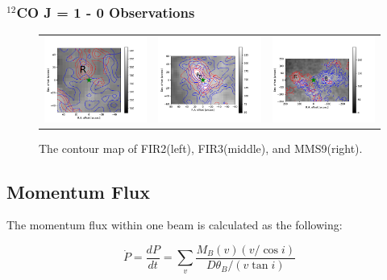 \documentclass[twoside,11pt]{gshs_thesis}
\begin{document}
\subsubsection{$^{12}$CO J = 1 - 0 Observations}

\begin{figure}[h!]
	\begin{tabular}{ccc}
		\includegraphics[width = 5cm]{Orion_12CO_NRO_HOPS68_rbcontour_400.png} & \includegraphics[width = 5cm]{Orion_12CO_NRO_HOPS370_rbcontour_400.png} & \includegraphics[width = 5cm]{Orion_12CO_NRO_HOPS78_rbcontour_400.png}
	\end{tabular} 
	\caption{The contour map of FIR2(left), FIR3(middle), and MMS9(right). }
\end{figure}
 

\subsection{Momentum Flux}

The momentum flux within one beam is calculated as the following:

\begin{equation}
\dot{P} = \frac{dP}{dt} = \sum_{v} {\frac{M_B (v) (v/ \cos i)}{D\theta_B / (v \tan i)}}
\end{equation}
\end{document}
